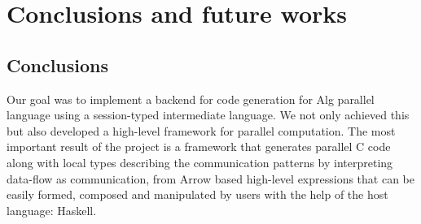 \chapter{Conclusions and future works}
\section{Conclusions}

Our goal was to implement a backend for code generation for Alg parallel language using a session-typed intermediate language. We not only achieved this but also developed a high-level framework for parallel computation. The most important result of the project is a framework that generates parallel C code along with local types describing the communication patterns by interpreting data-flow as communication, from Arrow based high-level expressions that can be easily formed, composed and manipulated by users with the help of the host language: Haskell. %

